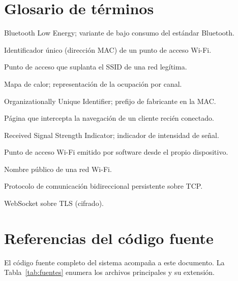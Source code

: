 \appendix
\chapter{Glosario de términos}
\label{anexo:glosario}
\begin{description}[leftmargin=2.2cm,style=nextline]
  \item[BLE] Bluetooth Low Energy; variante de bajo consumo del estándar Bluetooth.
  \item[BSSID] Identificador único (dirección MAC) de un punto de acceso Wi\nobreakdash-Fi.
  \item[Evil twin] Punto de acceso que suplanta el SSID de una red legítima.
  \item[Heatmap] Mapa de calor; representación de la ocupación por canal.
  \item[OUI] Organizationally Unique Identifier; prefijo de fabricante en la MAC.
  \item[Portal cautivo] Página que intercepta la navegación de un cliente recién conectado.
  \item[RSSI] Received Signal Strength Indicator; indicador de intensidad de señal.
  \item[SoftAP] Punto de acceso Wi\nobreakdash-Fi emitido por software desde el propio dispositivo.
  \item[SSID] Nombre público de una red Wi\nobreakdash-Fi.
  \item[WebSocket] Protocolo de comunicación bidireccional persistente sobre TCP.
  \item[WSS] WebSocket sobre TLS (cifrado).
\end{description}

\chapter{Referencias del código fuente}
\label{anexo:codigo}
El código fuente completo del sistema acompaña a este documento. La Tabla~\ref{tab:fuentes} enumera los archivos principales y su extensión.

